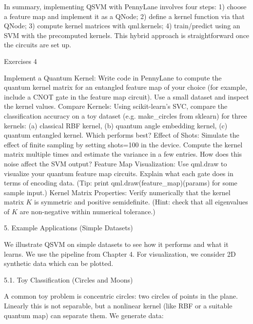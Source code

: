 In summary, implementing QSVM with PennyLane involves four steps: 1) choose a feature map and implement it as a QNode; 2) define a kernel function via that QNode; 3) compute kernel matrices with qml.kernels; 4) train/predict using an SVM with the precomputed kernels.  This hybrid approach is straightforward once the circuits are set up.





Exercises 4





Implement a Quantum Kernel: Write code in PennyLane to compute the quantum kernel matrix for an entangled feature map of your choice (for example, include a CNOT gate in the feature map circuit).  Use a small dataset and inspect the kernel values.
Compare Kernels: Using scikit-learn’s SVC, compare the classification accuracy on a toy dataset (e.g. make_circles from sklearn) for three kernels: (a) classical RBF kernel, (b) quantum angle embedding kernel, (c) quantum entangled kernel.  Which performs best?
Effect of Shots: Simulate the effect of finite sampling by setting shots=100 in the device.  Compute the kernel matrix multiple times and estimate the variance in a few entries.  How does this noise affect the SVM output?
Feature Map Visualization: Use qml.draw to visualize your quantum feature map circuits.  Explain what each gate does in terms of encoding data.  (Tip: print qml.draw(feature_map)(params) for some sample input.)
Kernel Matrix Properties: Verify numerically that the kernel matrix $K$ is symmetric and positive semidefinite.  (Hint: check that all eigenvalues of $K$ are non-negative within numerical tolerance.)






5. Example Applications (Simple Datasets)





We illustrate QSVM on simple datasets to see how it performs and what it learns.  We use the pipeline from Chapter 4.  For visualization, we consider 2D synthetic data which can be plotted.





5.1. Toy Classification (Circles and Moons)





A common toy problem is concentric circles: two circles of points in the plane.  Linearly this is not separable, but a nonlinear kernel (like RBF or a suitable quantum map) can separate them.  We generate data:

